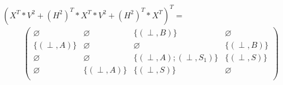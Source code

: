\documentclass[12pt]{article}  %
\theoremstyle{definition}
\theoremstyle{remark}
\begin{document}
$(X^T *V^2 + (H^2)^T * X^T  * V^2 + (H^2)^T * X^T)^T=$
\begin{align*}
\begin{pmatrix}
      \varnothing            & \varnothing            & \{ (\perp,B) \}            & \varnothing            \\
      \{ (\perp,A) \}        & \varnothing            & \varnothing                & \{ (\perp,B) \}    \\
      \varnothing            & \varnothing            & \{ (\perp,A);(\perp,S_1) \}            & \{ (\perp,S) \}     \\
      \varnothing            & \{ (\perp,A) \}        & \{ (\perp,S) \}      & \varnothing  \\
\end{pmatrix}
\end{align*}
\end{document}
